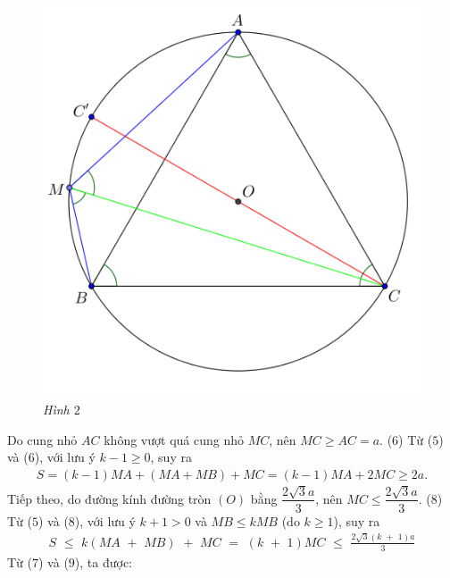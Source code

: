 \begin{multicols}{2}
	\begin{figure}[H]
		\vspace*{-5pt}
		\centering
		\captionsetup{labelformat= empty, justification=centering}
		\includegraphics[width= 1\linewidth]{P665H2}
		\caption{\small\textit{\color{thachthuctoanhoc}Hình $2$}}
		\vspace*{-10pt}
	\end{figure}
	Do cung nhỏ $AC$ không vượt quá cung nhỏ $MC$, nên $MC \ge AC = a$. \hfill ($6$)
	\vskip 0.05cm
	Từ ($5$) và ($6$), với lưu ý $k - 1 \ge 0$, suy ra
	\begin{align*}
		S = (k - 1)MA + (MA + MB) + MC = (k - 1)MA + 2MC \ge 2a.                      \tag{$7$}
	\end{align*}
	Tiếp theo, do đường kính đường tròn $(O)$ bằng $\dfrac{2\sqrt{3}a}{3}$, nên  $MC \le \dfrac{2\sqrt{3}a}{3}$. \hfill ($8$)
	\vskip 0.05cm
	Từ ($5$) và ($8$), với lưu ý $k + 1 > 0$ và $MB \le kMB$ (do $k \ge 1$), suy ra
	\begin{align*}
		S\,\, \le \,\,k\left( {MA\,\, + \,\,MB} \right)\,\, + \,\,MC\,\, = \,\,\left( {k\,\, + \,\,1} \right)MC\,\, \le \,\,\frac{{2\sqrt 3 \left( {k\,\, + \,\,1} \right)a}}{3} \tag{$9$}
	\end{align*}
	Từ ($7$) và ($9$), ta được:
	\begin{align*}

\end{align*}
\end{multicols}
